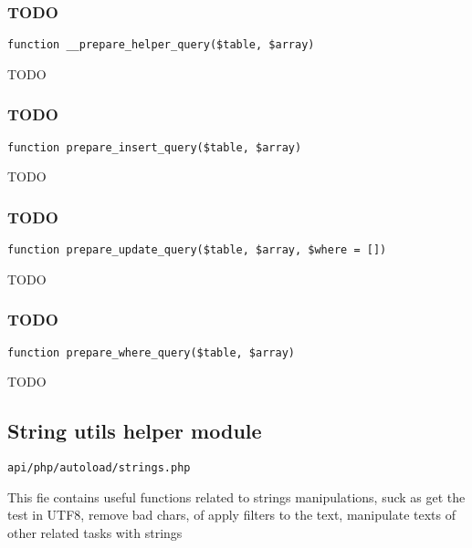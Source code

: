 \documentclass[a4paper]{article}
\begin{document}
\hypertarget{toc232}{}
\subsubsection{TODO}

\begin{lstlisting}
function __prepare_helper_query($table, $array)
\end{lstlisting}

TODO

\hypertarget{toc233}{}
\subsubsection{TODO}

\begin{lstlisting}
function prepare_insert_query($table, $array)
\end{lstlisting}

TODO

\hypertarget{toc234}{}
\subsubsection{TODO}

\begin{lstlisting}
function prepare_update_query($table, $array, $where = [])
\end{lstlisting}

TODO

\hypertarget{toc235}{}
\subsubsection{TODO}

\begin{lstlisting}
function prepare_where_query($table, $array)
\end{lstlisting}

TODO

\hypertarget{toc236}{}
\subsection{String utils helper module}

\begin{lstlisting}
api/php/autoload/strings.php
\end{lstlisting}

This fie contains useful functions related to strings manipulations, suck as get the test in
UTF8, remove bad chars, of apply filters to the text, manipulate texts of other related tasks
with strings
\end{document}
